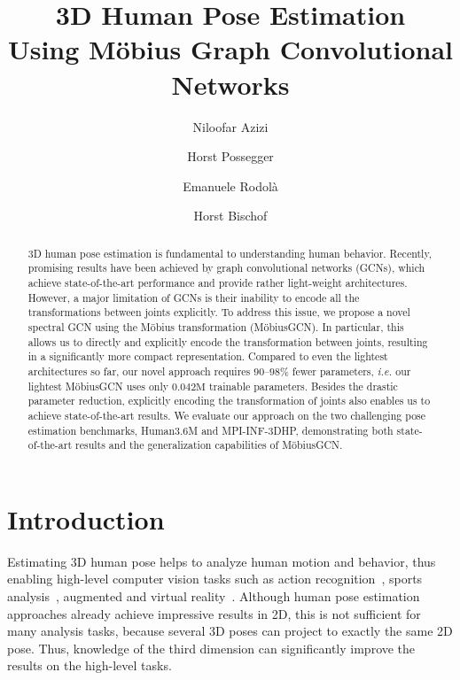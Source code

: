 \documentclass[runningheads]{llncs}
\begin{document}
\pagestyle{headings}
\mainmatter


\newcommand{\expect}[1]{\ensuremath{\operatorname{\mathbb{E}}\!\left[ #1 \right]}}
\newcommand{\var}[1]{\ensuremath{\operatorname{Var}\!\left[ #1 \right]}}
\newcommand{\ie}[0]{\emph{i.e. }}
\newcommand{\eg}[0]{\emph{e.g. }}



\title{3D Human Pose Estimation\\Using M\"obius Graph Convolutional Networks} 

\author{Niloofar Azizi \and
Horst Possegger \and
Emanuele Rodol\`a \and
Horst Bischof}



\maketitle
\begin{abstract}
3D human pose estimation is fundamental to understanding human behavior. Recently, promising results have been achieved by graph convolutional networks (GCNs), which achieve state-of-the-art performance and provide rather light-weight architectures.
However, a major limitation of GCNs is their inability to encode all the transformations between joints explicitly. To address this issue, we propose a novel spectral GCN using the M\"obius transformation (M\"obiusGCN). In particular, this allows us to directly and explicitly encode the transformation between joints, resulting in a significantly more compact representation. Compared to even the lightest architectures so far, our novel approach requires $90$--$98\%$ fewer parameters, \ie our lightest M\"obiusGCN uses only $0.042\text{M}$ trainable parameters. Besides the drastic parameter reduction, explicitly encoding the transformation of joints also enables us to achieve state-of-the-art results.
We evaluate our approach on the two challenging pose estimation benchmarks, Human3.6M and MPI-INF-3DHP, demonstrating both state-of-the-art results and the generalization capabilities of M\"obiusGCN.
\end{abstract}

\section{Introduction}
Estimating 3D human pose helps to analyze human motion and behavior, thus enabling high-level computer vision tasks such as action recognition~\cite{luvizon20182d}, sports analysis~\cite{wang2019ai, rematas2018soccer},  augmented and virtual reality~\cite{han2018viton}. Although human pose estimation approaches already achieve impressive results in 2D, this is not sufficient for many analysis tasks, because several 3D poses can project to exactly the same 2D pose. Thus, knowledge of the third dimension can significantly improve the results on the high-level tasks.
\end{document}
